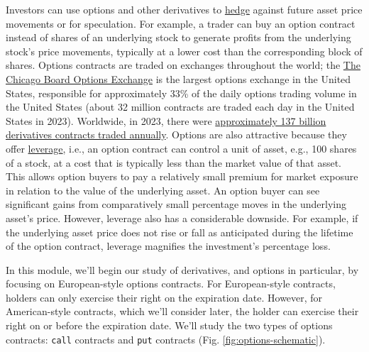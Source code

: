 \documentclass[11pt]{article}
\theoremstyle{definition}
\begin{document}
Investors can use options and other derivatives to \href{https://www.investopedia.com/terms/h/hedge.asp}{hedge} against future asset price movements or for speculation. 
For example, a trader can buy an option contract instead of shares of an underlying stock to generate profits from the underlying stock's price movements, 
typically at a lower cost than the corresponding block of shares. Options contracts are traded on exchanges throughout the world; 
the \href{https://www.cboe.com}{The Chicago Board Options Exchange} is the largest options exchange in the United States, 
responsible for approximately 33\% of the daily options trading volume in the United States (about 32 million contracts are traded each day in the United States in 2023). 
Worldwide, in 2023, there were \href{https://www.fia.org/fia/articles/global-futures-and-options-volume-hits-record-137-billion-contracts-2023}{approximately 137 billion derivatives contracts traded annually}.
Options are also attractive because they offer \href{https://www.merrilledge.com/investment-products/options/options-trading-leverage-risk}{leverage}, 
i.e., an option contract can control a unit of asset, e.g., 100 shares of a stock, 
at a cost that is typically less than the market value of that asset. 
This allows option buyers to pay a relatively small premium for market exposure in relation to the value of the underlying asset. 
An option buyer can see significant gains from comparatively small percentage moves in the underlying asset's price. 
However, leverage also has a considerable downside. 
For example, if the underlying asset price does not rise or fall as anticipated during the lifetime of the option contract, 
leverage magnifies the investment's percentage loss.

In this module, we'll begin our study of derivatives, and options in particular, by focusing on European-style options contracts.
For European-style contracts, holders can only exercise their right on the expiration date.
However, for American-style contracts, which we'll consider later, the holder can exercise their right on or before the expiration date.
We'll study the two types of options contracts: \texttt{call} contracts and \texttt{put} contracts (Fig. \ref{fig:options-schematic}).

\end{document}
